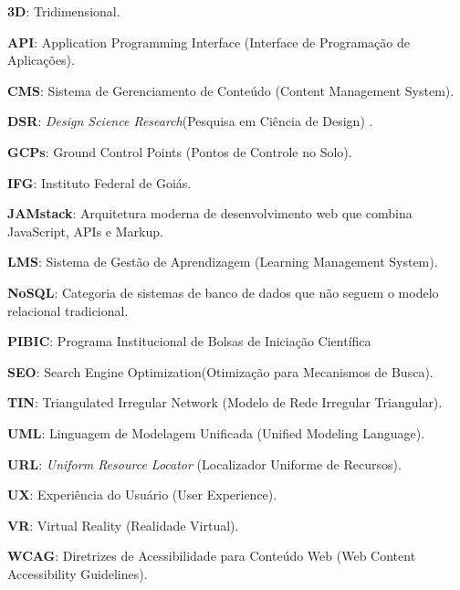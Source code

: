 \textbf{3D}: Tridimensional.

\textbf{API}: Application Programming Interface (Interface de Programação de Aplicações).

\textbf{CMS}: Sistema de Gerenciamento de Conteúdo (Content Management System).

\textbf{DSR}: \textit{Design Science Research}(Pesquisa em Ciência de Design) .

\textbf{GCPs}: Ground Control Points (Pontos de Controle no Solo).

\textbf{IFG}: Instituto Federal de Goiás.

\textbf{JAMstack}: Arquitetura moderna de desenvolvimento web que combina JavaScript, APIs e Markup.

\textbf{LMS}: Sistema de Gestão de Aprendizagem (Learning Management System).

\textbf{NoSQL}: Categoria de sistemas de banco de dados que não seguem o modelo relacional tradicional.

\textbf{PIBIC}: Programa Institucional de Bolsas de Iniciação Científica

\textbf{SEO}: Search Engine Optimization(Otimização para Mecanismos de Busca).

\textbf{TIN}: Triangulated Irregular Network (Modelo de Rede Irregular Triangular).

\textbf{UML}: Linguagem de Modelagem Unificada (Unified Modeling Language).

\textbf{URL}:\textit{ Uniform Resource Locator} (Localizador Uniforme de Recursos).

\textbf{UX}: Experiência do Usuário (User Experience).

\textbf{VR}: Virtual Reality (Realidade Virtual).

\textbf{WCAG}: Diretrizes de Acessibilidade para Conteúdo Web (Web Content Accessibility Guidelines).